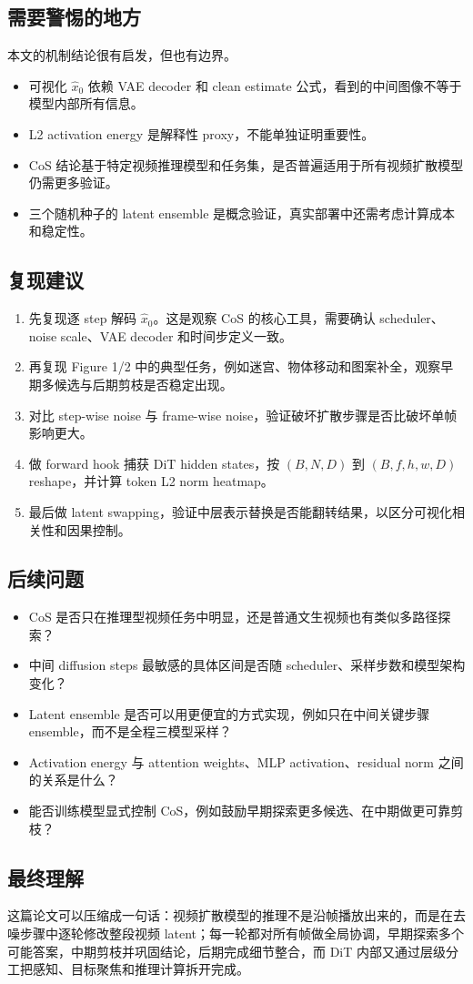 \subsection{需要警惕的地方}

本文的机制结论很有启发，但也有边界。

\begin{itemize}
    \item 可视化 $\hat{x}_0$ 依赖 VAE decoder 和 clean estimate 公式，看到的中间图像不等于模型内部所有信息。
    \item L2 activation energy 是解释性 proxy，不能单独证明重要性。
    \item CoS 结论基于特定视频推理模型和任务集，是否普遍适用于所有视频扩散模型仍需更多验证。
    \item 三个随机种子的 latent ensemble 是概念验证，真实部署中还需考虑计算成本和稳定性。
\end{itemize}

\subsection{复现建议}

\begin{enumerate}
    \item 先复现逐 step 解码 $\hat{x}_0$。这是观察 CoS 的核心工具，需要确认 scheduler、noise scale、VAE decoder 和时间步定义一致。
    \item 再复现 Figure 1/2 中的典型任务，例如迷宫、物体移动和图案补全，观察早期多候选与后期剪枝是否稳定出现。
    \item 对比 step-wise noise 与 frame-wise noise，验证破坏扩散步骤是否比破坏单帧影响更大。
    \item 做 forward hook 捕获 DiT hidden states，按 $(B,N,D)$ 到 $(B,f,h,w,D)$ reshape，并计算 token L2 norm heatmap。
    \item 最后做 latent swapping，验证中层表示替换是否能翻转结果，以区分可视化相关性和因果控制。
\end{enumerate}

\subsection{后续问题}

\begin{itemize}
    \item CoS 是否只在推理型视频任务中明显，还是普通文生视频也有类似多路径探索？
    \item 中间 diffusion steps 最敏感的具体区间是否随 scheduler、采样步数和模型架构变化？
    \item Latent ensemble 是否可以用更便宜的方式实现，例如只在中间关键步骤 ensemble，而不是全程三模型采样？
    \item Activation energy 与 attention weights、MLP activation、residual norm 之间的关系是什么？
    \item 能否训练模型显式控制 CoS，例如鼓励早期探索更多候选、在中期做更可靠剪枝？
\end{itemize}

\subsection{最终理解}

这篇论文可以压缩成一句话：视频扩散模型的推理不是沿帧播放出来的，而是在去噪步骤中逐轮修改整段视频 latent；每一轮都对所有帧做全局协调，早期探索多个可能答案，中期剪枝并巩固结论，后期完成细节整合，而 DiT 内部又通过层级分工把感知、目标聚焦和推理计算拆开完成。
